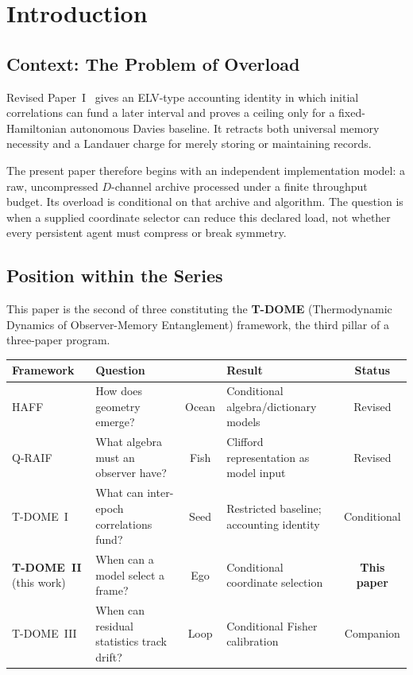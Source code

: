 \documentclass[12pt,a4paper,openany]{book}
\begin{document}
\section{Introduction}
\label{T-II-sec:intro}

\subsection{Context: The Problem of Overload}
\label{T-II-subsec:overload}

Revised Paper~I~\cite{Liu2026TDOME_I} gives an ELV-type
accounting identity in which initial correlations can fund a later
interval and proves a ceiling only for a fixed-Hamiltonian autonomous
Davies baseline.  It retracts both universal memory necessity and a
Landauer charge for merely storing or maintaining records.

The present paper therefore begins with an independent implementation
model: a raw, uncompressed $D$-channel archive processed under a finite
throughput budget.  Its overload is conditional on that archive and
algorithm.  The question is when a supplied coordinate selector can
reduce this declared load, not whether every persistent agent must
compress or break symmetry.

\subsection{Position within the Series}
\label{T-II-subsec:series_position}

This paper is the second of three constituting the
\textbf{T-DOME} (Thermodynamic Dynamics of Observer-Memory
Entanglement) framework, the third pillar of a three-paper
program.

\begin{center}
\small
\setlength{\tabcolsep}{4pt}%
\begin{tabular}{@{}lP{3.2cm}cP{3.4cm}c@{}}
\toprule
\textbf{Framework} & \textbf{Question} & & \textbf{Result}
  & \textbf{Status} \\
\midrule
HAFF~\cite{Liu2026HAFF_A,Liu2026HAFF_B}
  & How does geometry emerge?
  & Ocean
  & Conditional algebra/dictionary models
  & Revised \\[3pt]
Q-RAIF~\cite{Liu2026QRAIF_A,Liu2026QRAIF_B}
  & What algebra must an observer have?
  & Fish
  & Clifford representation as model input
  & Revised \\[3pt]
T-DOME~I~\cite{Liu2026TDOME_I}
  & What can inter-epoch correlations fund?
  & Seed
  & Restricted baseline; accounting identity
  & Conditional \\[3pt]
\textbf{T-DOME~II} (this work)
  & When can a model select a frame?
  & Ego
  & Conditional coordinate selection
  & \textbf{This paper} \\[3pt]
T-DOME~III
  & When can residual statistics track drift?
  & Loop
  & Conditional Fisher calibration
  & Companion \\
\bottomrule
\end{tabular}
\end{center}
\end{document}
